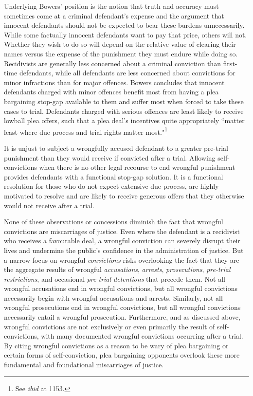 Underlying Bowers' position is the notion that truth and accuracy must sometimes come at a criminal defendant's expense and the argument that innocent defendants should not be expected to bear these burdens unnecessarily. While some factually innocent defendants want to pay that price, others will not. Whether they wish to do so will depend on the relative value of clearing their names versus the expense of the punishment they must endure while doing so. Recidivists are generally less concerned about a criminal conviction than first-time defendants, while all defendants are less concerned about convictions for minor infractions than for major offences. Bowers concludes that innocent defendants charged with minor offences benefit most from having a plea bargaining stop-gap available to them and suffer most when forced to take these cases to trial. Defendants charged with serious offences are least likely to receive lowball plea offers, such that a plea deal's incentives quite appropriately ``matter least where due process and trial rights matter most."\footnote{See \textit{ibid} at 1153.} 

It is unjust to subject a wrongfully accused defendant to a greater pre-trial punishment than they would receive if convicted after a trial. Allowing self-convictions when there is no other legal recourse to end wrongful punishment provides defendants with a functional stop-gap solution. It is a functional resolution for those who do not expect extensive due process, are highly motivated to resolve and are likely to receive generous offers that they otherwise would not receive after a trial. 

None of these observations or concessions diminish the fact that wrongful convictions are miscarriages of justice. Even where the defendant is a recidivist who receives a favourable deal, a wrongful conviction can severely disrupt their lives and undermine the public's confidence in the administration of justice. But a narrow focus on wrongful \textit{convictions} risks overlooking the fact that they are the aggregate results of wrongful \textit{accusations}, \textit{arrests}, \textit{prosecutions}, \textit{pre-trial restrictions}, and occasional \textit{pre-trial detentions} that precede them. Not all wrongful accusations end in wrongful convictions, but all wrongful convictions necessarily begin with wrongful accusations and arrests. Similarly, not all wrongful prosecutions end in wrongful convictions, but all wrongful convictions necessarily entail a wrongful prosecution. Furthermore, and as discussed above, wrongful convictions are not exclusively or even primarily the result of self-convictions, with many documented wrongful convictions occurring after a trial. By citing wrongful convictions as a reason to be wary of plea bargaining or certain forms of self-conviction, plea bargaining opponents overlook these more fundamental and foundational miscarriages of justice.

